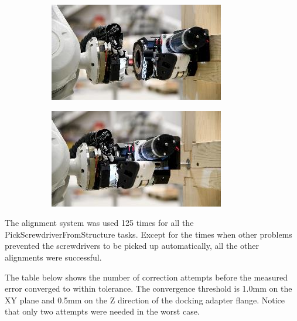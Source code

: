 \documentclass[11pt]{book}
\begin{document}
\begin{figure}[H]
\centering
\begin{subfigure}[b]{0.45\textwidth}
\centering
\includegraphics[width=\textwidth]{./images/image57.jpeg}
\end{subfigure}
\hfill
\begin{subfigure}[b]{0.45\textwidth}
\centering
\includegraphics[width=\textwidth]{./images/image58.jpeg}
\end{subfigure}
\end{figure}


The alignment system was used 125 times for all the PickScrewdriverFromStructure tasks. Except for the times when other problems prevented the screwdrivers to be picked up automatically, all the other alignments were successful.

The table below shows the number of correction attempts before the measured error converged to within tolerance. The convergence threshold is 1.0mm on the XY plane and 0.5mm on the Z direction of the docking adapter flange. Notice that only two attempts were needed in the worst case.
\end{document}
